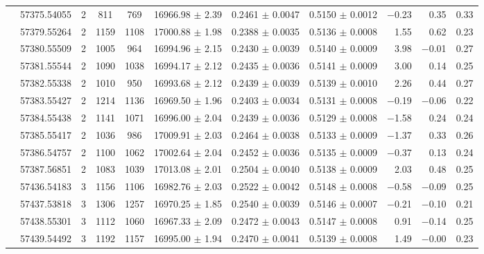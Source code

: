 \documentclass[a4paper,fleqn,usenatbib]{mnras}
\begin{document}
\begin{table*}
\begin{threeparttable}
{\begin{tabular}{c c c c c c c c r r c}
 & 57375.54055  & 2 &   811 & 769 &  16966.98 $\pm$ 2.39  &   0.2461 $\pm$ 0.0047  &   0.5150 $\pm$ 0.0012  &$-$0.23  &    0.35    &  0.33\\  
 & 57379.55264  & 2 & 1159 & 1108 &  17000.88 $\pm$ 1.98  &   0.2388 $\pm$ 0.0035  &   0.5136 $\pm$ 0.0008  &     1.55  &    0.62     &  0.23\\  
 & 57380.55509  & 2 & 1005 & 964 &  16994.96 $\pm$ 2.15  &   0.2430 $\pm$ 0.0039  &   0.5140 $\pm$ 0.0009  &     3.98  &   $-$0.01     &  0.27\\  
 & 57381.55544  & 2 & 1090 & 1038 &  16994.17 $\pm$ 2.12  &   0.2435 $\pm$ 0.0036  &   0.5141 $\pm$ 0.0009  &     3.00  &     0.14     &  0.25\\ 
 & 57382.55338  & 2 & 1010 & 950 &  16993.68 $\pm$ 2.12  &   0.2439 $\pm$ 0.0039  &   0.5139 $\pm$ 0.0010  &     2.26  &    0.44     &  0.27\\  
 & 57383.55427  & 2 & 1214 & 1136 &  16969.50 $\pm$ 1.96  &   0.2403 $\pm$ 0.0034  &   0.5131 $\pm$ 0.0008  &$-$0.19  &   $-$0.06     &  0.22\\  
 & 57384.55438  & 2 & 1141 & 1071 &  16996.00 $\pm$ 2.04  &   0.2439 $\pm$ 0.0036  &   0.5129 $\pm$ 0.0008  &$-$1.58  &    0.24     &  0.24\\  
 & 57385.55417  & 2 & 1036 & 986 &  17009.91 $\pm$ 2.03  &   0.2464 $\pm$ 0.0038  &   0.5133 $\pm$ 0.0009  &$-$1.37  &    0.33     &  0.26\\  
 & 57386.54757  & 2 & 1100 & 1062 &  17002.64 $\pm$ 2.04  &   0.2452 $\pm$ 0.0036  &   0.5135 $\pm$ 0.0009  &$-$0.37  &    0.13     &  0.24\\  
 & 57387.56851  & 2 & 1083 & 1039 &  17013.08 $\pm$ 2.01  &   0.2504 $\pm$ 0.0040  &   0.5138 $\pm$ 0.0009  &     2.03  &    0.48     &  0.25\\[3pt]  
\parbox[t]{1mm}{} & 57436.54183  & 3 & 1156 & 1106 &  16982.76 $\pm$ 2.03  &   0.2522 $\pm$ 0.0042  &   0.5148 $\pm$ 0.0008  &$-$0.58  &  $-$0.09 & 0.25\\  
 & 57437.53818  & 3 & 1306 & 1257 & 16970.25 $\pm$ 1.85  &   0.2540 $\pm$ 0.0039  &   0.5146 $\pm$ 0.0007  &$-$0.21  &   $-$0.10    & 0.21\\  
 & 57438.55301  & 3 & 1112 & 1060 & 16967.33 $\pm$ 2.09  &   0.2472 $\pm$ 0.0043  &   0.5147 $\pm$ 0.0008  &     0.91  &   $-$0.14    &  0.25\\   
 & 57439.54492  & 3 & 1192 & 1157 & 16995.00 $\pm$ 1.94  &   0.2470 $\pm$ 0.0041  &   0.5139 $\pm$ 0.0008  &     1.49  &   $-$0.00    & 0.23\\  

\end{tabular}}
\end{threeparttable}
\end{table*}
\end{document}
